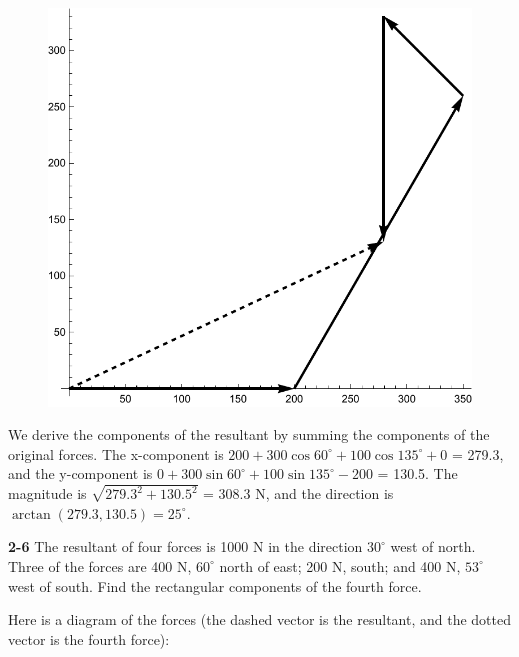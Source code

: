 \documentclass{amsart}
\begin{document}
\begin{figure}[h]
\includegraphics[scale=0.4]{2-5b}
\end{figure}

We derive the components of the resultant by summing the components of the original forces.
The x-component is $200 + 300 \cos 60^\circ + 100 \cos 135^\circ + 0$ = 279.3,
and the y-component is $0 + 300 \sin 60^\circ + 100 \sin 135^\circ - 200$ = 130.5.
The magnitude is $\sqrt{279.3^2 + 130.5^2}$ = 308.3 N, and the direction is
$\arctan (279.3, 130.5) = 25^\circ$.

\vspace{\baselineskip}
\noindent
\textbf{2-6} The resultant of four forces is 1000 N in the direction $30^\circ$ west of north.
Three of the forces are 400 N, $60^\circ$ north of east; 200 N, south; and 400 N, $53^\circ$ west of south.
Find the rectangular components of the fourth force.

\clearpage
Here is a diagram of the forces (the dashed vector is the resultant, and the dotted vector is the fourth force):
\end{document}
